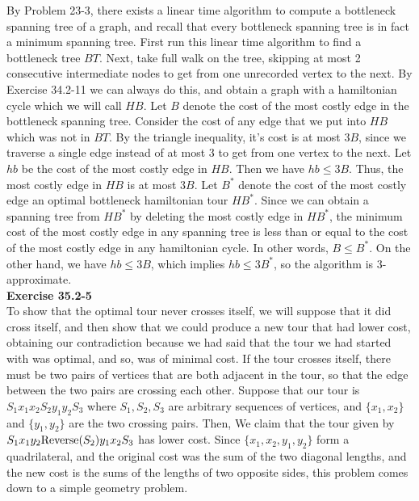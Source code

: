 \documentclass{article}
\begin{document}
By Problem 23-3, there exists a linear time algorithm to compute a bottleneck spanning tree of a graph, and recall that every bottleneck spanning tree is in fact a minimum spanning tree.  First run this linear time algorithm to find a bottleneck tree $BT$. Next, take full walk on the tree, skipping at most 2 consecutive intermediate nodes to get from one unrecorded vertex to the next.  By Exercise 34.2-11 we can always do this, and obtain a graph with a hamiltonian cycle which we will call $HB$.  Let $B$ denote the cost of the most costly edge in the bottleneck spanning tree.  Consider the cost of any edge that we put into $HB$ which was not in $BT$.  By the triangle inequality, it's cost is at most $3B$, since we traverse a single edge instead of at most 3 to get from one vertex to the next.   Let $hb$ be the cost of the most costly edge in $HB$.  Then we have $hb \leq 3B$.  Thus, the most costly edge in $HB$ is at most $3B$.  Let $B^*$ denote the cost of the most costly edge an optimal bottleneck hamiltonian tour $HB^*$.  Since we can obtain a spanning tree from $HB^*$ by deleting the most costly edge in $HB^*$, the minimum cost of the most costly edge in any spanning tree is less than or equal to the cost of the most costly edge in any hamiltonian cycle.  In other words, $B \leq B^*$.  On the other hand, we have $hb \leq 3B$, which implies $hb \leq 3B^*$, so the algorithm is 3-approximate.  \\

\noindent\textbf{Exercise 35.2-5}\\

To show that the optimal tour never crosses itself, we will suppose that it did cross itself, and then show that we could produce a new tour that had lower cost, obtaining our contradiction because we had said that the tour we had started with was optimal, and so, was of minimal cost. If the tour crosses itself, there must be two pairs of vertices that are both adjacent in the tour, so that the edge between the two pairs are crossing each other. Suppose that our tour is $S_1x_1 x_2 S_2 y_1 y_2 S_3$ where $S_1,S_2,S_3$ are arbitrary sequences of vertices, and $\{x_1,x_2\}$ and $\{y_1,y_2\}$ are the two crossing pairs. Then, We claim that the tour given by $S_1 x_1 y_2 \hbox{Reverse}(S_2) y_1 x_2 S_3$ has lower cost. Since $\{x_1,x_2,y_1,y_2\}$ form a quadrilateral, and the original cost was the sum of the two diagonal lengths, and the new cost is the sums of the lengths of two opposite sides, this problem comes down to a simple geometry problem.
\end{document}
